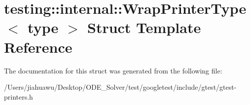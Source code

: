 \hypertarget{structtesting_1_1internal_1_1_wrap_printer_type}{}\section{testing\+:\+:internal\+:\+:Wrap\+Printer\+Type$<$ type $>$ Struct Template Reference}
\label{structtesting_1_1internal_1_1_wrap_printer_type}


The documentation for this struct was generated from the following file\+:\begin{DoxyCompactItemize}
\item 
/\+Users/jiahuawu/\+Desktop/\+O\+D\+E\+\_\+\+Solver/test/googletest/include/gtest/gtest-\/printers.\+h\end{DoxyCompactItemize}
